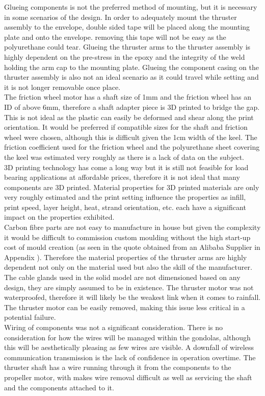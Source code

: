 \documentclass[../main.tex]{subfiles}
\begin{document}
Glueing components is not the preferred method of mounting, but it is necessary in some scenarios of the design. In order to adequately mount the thruster assembly to the envelope, double sided tape will be placed along the mounting plate and onto the envelope. removing this tape will not be easy as the polyurethane could tear. Glueing the thruster arms to the thruster assembly is highly dependent on the pre-stress in the epoxy and the integrity of the weld holding the arm cap to the mounting plate. Glueing the component casing on the thruster assembly is also not an ideal scenario as it could travel while setting and it is not longer removable once place.\\

The friction wheel motor has a shaft size of 1mm and the friction wheel has an ID of above 6mm, therefore a shaft adapter piece is 3D printed to bridge the gap. This is not ideal as the plastic can easily be deformed and shear along the print orientation. It would be preferred if compatible sizes for the shaft and friction wheel were chosen, although this is difficult given the 1cm width of the keel. The friction coefficient used for the friction wheel and the polyurethane sheet covering the keel was estimated very roughly as there is a lack of data on the subject.\\

3D printing technology has come a long way but it is still not feasible for load bearing applications at affordable prices, therefore it is not ideal that many components are 3D printed. Material properties for 3D printed materials are only very roughly estimated and the print setting influence the properties as infill, print speed, layer height, heat, strand orientation, etc. each have a significant impact on the properties exhibited.\\

Carbon fibre parts are not easy to manufacture in house but given the complexity it would be difficult to commission custom moulding without the high start-up cost of mould creation (as seen in the quote obtained from an Alibaba Supplier in Appendix \cite{KEELQUOTE}). Therefore the material properties of the thruster arms are highly dependent not only on the material used but also the skill of the manufacturer.\\

The cable glands used in the solid model are not dimensioned based on any design, they are simply assumed to be in existence. The thruster motor was not waterproofed, therefore it will likely be the weakest link when it comes to rainfall. The thruster motor can be easily removed, making this issue less critical in a potential failure. \\

Wiring of components was not a significant consideration. There is no consideration for how the wires will be managed within the gondolas, although this will be aesthetically pleasing as few wires are visible. A downfall of wireless communication transmission is the lack of confidence in operation overtime. The thruster shaft has a wire running through it from the components to the propeller motor, with makes wire removal difficult as well as servicing the shaft and the components attached to it.\\
\end{document}
